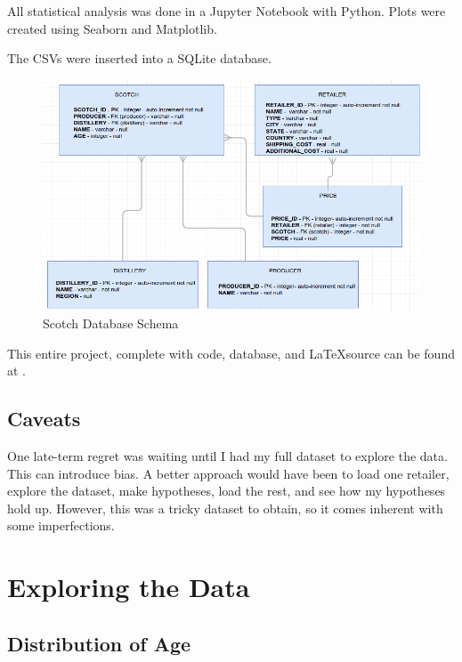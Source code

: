 All statistical analysis was done in a Jupyter Notebook with Python. Plots were created using Seaborn and Matplotlib. 

The CSVs were inserted into a SQLite database.

\begin{figure}[htb]
\centering
\includegraphics[scale=.5]{scotch_prices_schema}
\caption{Scotch Database Schema}
\label{fig:scotch_database_schema} 
\end{figure}

This entire project, complete with code, database, and \LaTeX  source can be found at \cite{GitHub}.

\subsection{Caveats}
One late-term regret was waiting until I had my full dataset to explore the data. This can introduce bias. A better approach would have been to load one retailer, explore the dataset, make hypotheses, load the rest, and see how my hypotheses hold up. \cite{StatisticsDoneWrong} However, this was a tricky dataset to obtain, so it comes inherent with some imperfections.



\section{Exploring the Data}



\subsection{Distribution of Age}

